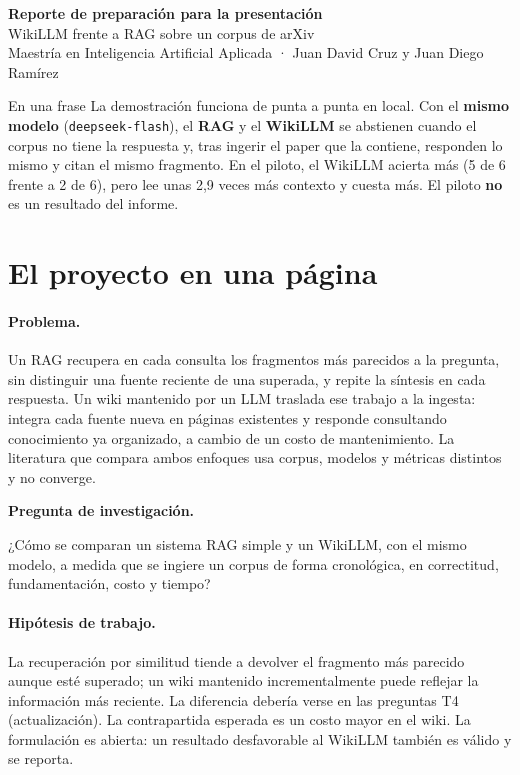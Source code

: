 \documentclass[11pt,a4paper]{article}
\newcommand{\RAG}{\textcolor{rag}{\textbf{RAG}}}
\newcommand{\WIKI}{\textcolor{wiki}{\textbf{WikiLLM}}}
\newcommand{\cod}[1]{\texttt{\small #1}}
\begin{document}
\begin{center}
  {\LARGE\bfseries Reporte de preparación para la presentación}\\[4pt]
  {\large WikiLLM frente a RAG sobre un corpus de arXiv}\\[2pt]
  {\small Maestría en Inteligencia Artificial Aplicada · Juan David Cruz y Juan Diego Ramírez}
\end{center}

\begin{clave}{En una frase}
La demostración funciona de punta a punta en local. Con el \textbf{mismo modelo}
(\cod{deepseek-flash}), el \RAG{} y el \WIKI{} se abstienen cuando el corpus no tiene la
respuesta y, tras ingerir el paper que la contiene, responden lo mismo y citan el mismo fragmento.
En el piloto, el WikiLLM acierta más (5 de 6 frente a 2 de 6), pero lee unas 2,9 veces más contexto
y cuesta más. El piloto \textbf{no} es un resultado del informe.
\end{clave}

\tableofcontents
\vspace{4pt}

\section{El proyecto en una página}

\paragraph{Problema.} Un RAG recupera en cada consulta los fragmentos más parecidos a la pregunta,
sin distinguir una fuente reciente de una superada, y repite la síntesis en cada respuesta. Un wiki
mantenido por un LLM traslada ese trabajo a la ingesta: integra cada fuente nueva en páginas
existentes y responde consultando conocimiento ya organizado, a cambio de un costo de
mantenimiento. La literatura que compara ambos enfoques usa corpus, modelos y métricas distintos y
no converge.

\textbf{Pregunta de investigación.}\par
\begin{decir}
¿Cómo se comparan un sistema RAG simple y un WikiLLM, con el mismo modelo, a medida que se ingiere
un corpus de forma cronológica, en correctitud, fundamentación, costo y tiempo?
\end{decir}

\paragraph{Hipótesis de trabajo.} La recuperación por similitud tiende a devolver el fragmento más
parecido aunque esté superado; un wiki mantenido incrementalmente puede reflejar la información más
reciente. La diferencia debería verse en las preguntas T4 (actualización). La contrapartida
esperada es un costo mayor en el wiki. La formulación es abierta: un resultado desfavorable al
WikiLLM también es válido y se reporta.
\end{document}
